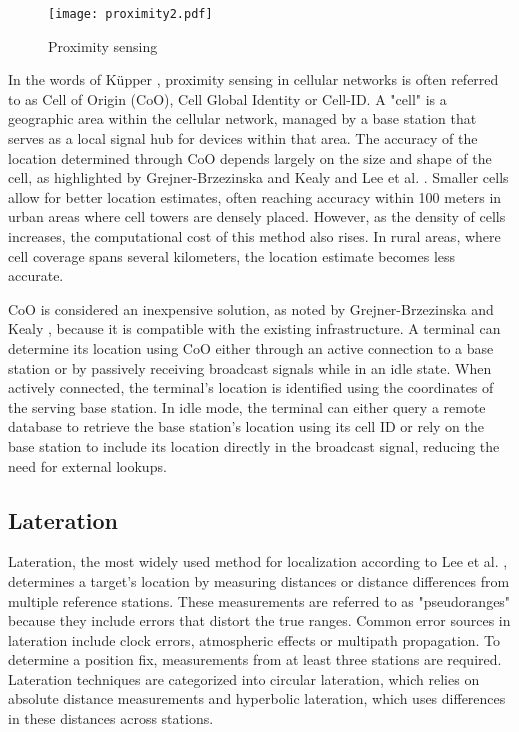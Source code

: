 \begin{figure}[htbp]
    \centering
    \texttt{[image: proximity2.pdf]}
    \caption{Proximity sensing \cite{militaru2024positioning}}
    \label{fig:proximity2}
\end{figure}

In the words of K\"upper \cite{kupper2005location}, proximity sensing in cellular networks is often referred to as Cell of Origin (CoO), Cell Global Identity or Cell-ID. 
A "cell" is a geographic area within the cellular network, managed by a base station that serves as a local signal hub for devices within that area. 
The accuracy of the location determined through CoO depends largely on the size and shape of the cell, as highlighted by Grejner-Brzezinska and Kealy \cite{grejner2004positioning} and Lee et al. \cite{lee2014localization}.
Smaller cells allow for better location estimates, often reaching accuracy within 100 meters in urban areas where cell towers are densely placed. However, as the density of cells increases, the computational cost of this method also rises.
In rural areas, where cell coverage spans several kilometers, the location estimate becomes less accurate.

CoO is considered an inexpensive solution, as noted by Grejner-Brzezinska and Kealy \cite{grejner2004positioning}, because it is compatible with the existing infrastructure. 
A terminal can determine its location using CoO either through an active connection to a base station or by passively receiving broadcast signals while in an idle state. 
When actively connected, the terminal's location is identified using the coordinates of the serving base station. 
In idle mode, the terminal can either query a remote database to retrieve the base station's location using its cell ID or rely on the base station to include its location directly in the broadcast signal, reducing the need for external lookups. 

\subsection{Lateration}
Lateration, the most widely used method for localization according to Lee et al. \cite{lee2014localization}, determines a target's location by measuring distances or distance differences from multiple reference stations. 
These measurements are referred to as "pseudoranges" because they include errors that distort the true ranges. 
Common error sources in lateration include clock errors, atmospheric effects or multipath propagation.
To determine a position fix, measurements from at least three stations are required.
Lateration techniques are categorized into circular lateration, which relies on absolute distance measurements and hyperbolic lateration, which uses differences in these distances across stations.


